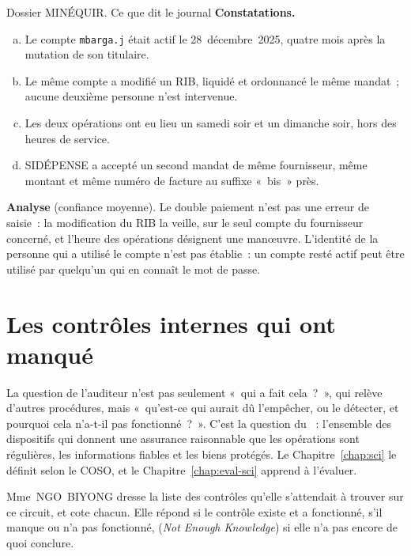 \begin{boxscenario}{Dossier MINÉQUIR. Ce que dit le journal}
\textbf{Constatations.}
\begin{enumerate}[(a)]
    \item Le compte \texttt{mbarga.j} était actif le 28~décembre~2025,
          quatre mois après la mutation de son titulaire.
    \item Le même compte a modifié un RIB, liquidé et ordonnancé le même
          mandat~; aucune deuxième personne n'est intervenue.
    \item Les deux opérations ont eu lieu un samedi soir et un dimanche
          soir, hors des heures de service.
    \item SIDÉPENSE a accepté un second mandat de même fournisseur, même
          montant et même numéro de facture au suffixe «~bis~» près.
\end{enumerate}

\medskip
\textbf{Analyse} (confiance moyenne). Le double paiement n'est pas une
erreur de saisie~: la modification du RIB la veille, sur le seul compte
du fournisseur concerné, et l'heure des opérations désignent une
manœuvre. L'identité de la personne qui a utilisé le compte n'est pas
établie~: un compte resté actif peut être utilisé par quelqu'un qui en
connaît le mot de passe.
\end{boxscenario}

\separateur

\section{Les contrôles internes qui ont manqué}
\label{sec:pro-controles}

La question de l'auditeur n'est pas seulement «~qui a fait cela~?~», qui
relève d'autres procédures, mais «~qu'est-ce qui aurait dû l'empêcher, ou
le détecter, et pourquoi cela n'a-t-il pas fonctionné~?~». C'est la
question du ~: l'ensemble
des dispositifs qui donnent une assurance raisonnable que les opérations
sont régulières, les informations fiables et les biens protégés. Le
Chapitre~\ref{chap:sci} le définit selon le COSO, et le
Chapitre~\ref{chap:eval-sci} apprend à l'évaluer.

Mme~NGO~BIYONG dresse la liste des contrôles qu'elle s'attendait à trouver
sur ce circuit, et cote chacun. Elle répond \OUI{} si le contrôle existe et
a fonctionné, \NON{} s'il manque ou n'a pas fonctionné, \NEK{}
(\textit{Not Enough Knowledge}) si elle n'a pas encore de quoi conclure.

